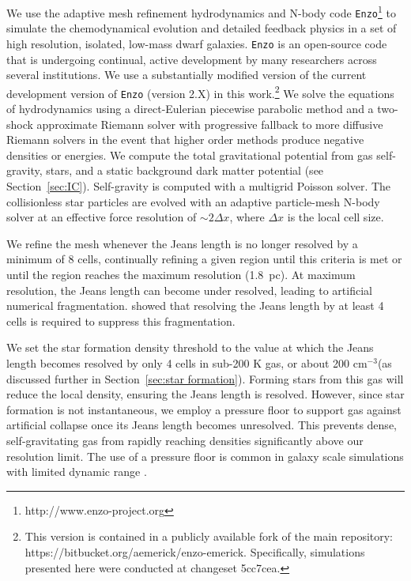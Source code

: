 \documentclass[twocolumn]{aastex61}
\newcommand{\ccunit}{cm$^{-3}$}
\begin{document}
We use the adaptive mesh refinement hydrodynamics and N-body code \texttt{Enzo}\footnote{http://www.enzo-project.org} to simulate the chemodynamical evolution and detailed feedback physics in a set of high resolution, isolated, low-mass dwarf galaxies. \texttt{Enzo} is an open-source code that is undergoing continual, active development by many researchers across several institutions. We use a substantially modified version of the current development version of \texttt{Enzo} (version 2.X) in this work.\footnote{This version is contained in a publicly available fork of the main repository: https://bitbucket.org/aemerick/enzo-emerick. Specifically, simulations presented here were conducted at changeset 5cc7cea.} We solve the equations of hydrodynamics using a direct-Eulerian piecewise parabolic method \citep{ColellaWoodward1984, Bryan1995} and a two-shock approximate Riemann solver with progressive fallback to more diffusive Riemann solvers in the event that higher order methods produce negative densities or energies. We compute the total gravitational potential from gas self-gravity, stars, and a static background dark matter potential (see Section~\ref{sec:IC}). Self-gravity is computed with a multigrid Poisson solver. The collisionless star particles are evolved with an adaptive particle-mesh N-body solver at an effective force resolution of $\sim 2 \Delta x$, where $\Delta x$ is the local cell size. 

We refine the mesh whenever the Jeans length is no longer resolved by a minimum of 8 cells, continually refining a given region until this criteria is met or until the region reaches the maximum resolution (1.8~pc). At maximum resolution, the Jeans length can become under resolved, leading to artificial numerical fragmentation. \citet{Truelove1997} showed that resolving the Jeans length by at least 4 cells is required to suppress this fragmentation.

We set the star formation density threshold to the value at which the Jeans length becomes resolved by only 4 cells in sub-200 K gas, or about 200 \ccunit (as discussed further in Section~\ref{sec:star formation}). Forming stars from this gas will reduce the local density, ensuring the Jeans length is resolved. However, since star formation is not instantaneous, we employ a pressure floor to support gas against artificial collapse once its Jeans length becomes unresolved. This prevents dense, self-gravitating gas from rapidly reaching densities significantly above our resolution limit. The use of a pressure floor is common in galaxy scale simulations with limited dynamic range \citep[e.g][]{Machacek2001, 2008ApJ...680.1083R}.
\end{document}
